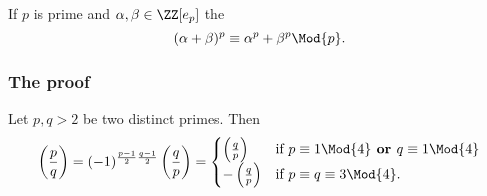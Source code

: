 \documentclass[12pt, a4paper]{article}
\begin{document}
\begin{theorem}
    If \(p\) is prime and \(\alpha,\beta \in \ZZ[e_p]\) the 
    \[(\alpha+\beta)^p \equiv \alpha^p +\beta^p \Mod{p}.\]
\end{theorem}




\subsubsection{The proof}

\begin{mdthm}
    Let \(p,q>2\) be two distinct primes. Then
    \[\begin{aligned}
        \left( \frac{p}{q} \right) = (-1)^{\frac{p-1}{2} \frac{q-1}{2}} \left( \frac{q}{p} \right) = 
        \begin{cases}
            \left( \frac{q}{p} \right) &\text{if } p \equiv 1 \Mod{4} \textbf{ or } q \equiv 1 \Mod{4} \\
            -\left( \frac{q}{p} \right) &\text{if } p \equiv q \equiv 3 \Mod{4}.
        \end{cases}
    \end{aligned}\]
\end{mdthm}
\end{document}
